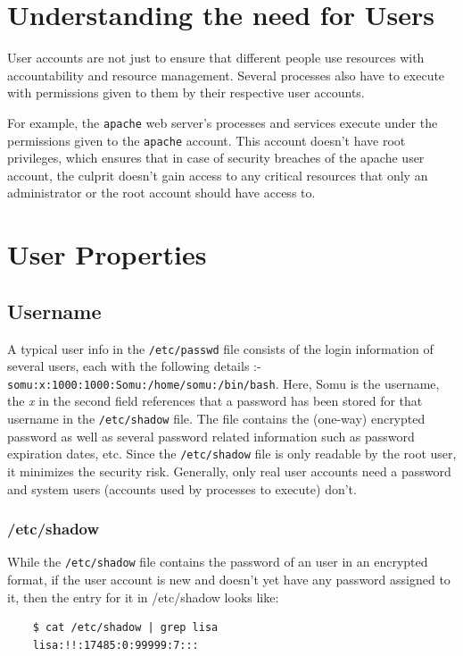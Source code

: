 \documentclass{report}
\begin{document}
	\section{Understanding the need for Users}
	User accounts are not just to ensure that different people use resources with accountability and resource management. Several processes also have to execute with permissions given to them by their respective user accounts. 
	
	For example, the \verb|apache| web server's processes and services execute under the permissions given to the \verb|apache| account. This account doesn't have root privileges, which ensures that in case of security breaches of the apache user account, the culprit doesn't gain access to any critical resources that only an administrator or the root account should have access to. 
	
	\section{User Properties}
	\subsection{Username}
	A typical user info in the \verb|/etc/passwd| file consists of the login information of several users, each with the following details :- \verb|somu:x:1000:1000:Somu:/home/somu:/bin/bash|. Here, Somu is the username, the \textit{x} in the second field references that a password has been stored for that username in the \verb|/etc/shadow| file. The file contains the (one-way) encrypted password as well as several password related information such as password expiration dates, etc. Since the \verb|/etc/shadow| file is only readable by the root user, it minimizes the security risk. Generally, only real user accounts need a password and system users (accounts used by processes to execute) don't. 
	
	\subsubsection{/etc/shadow}
	While the \verb|/etc/shadow| file contains the password of an user in an encrypted format, if the user account is new and doesn't yet have any password assigned to it, then the entry for it in /etc/shadow looks like: 
	
	\begin{verbatim}
	$ cat /etc/shadow | grep lisa
	lisa:!!:17485:0:99999:7:::
	\end{verbatim} 
	
\end{document}
